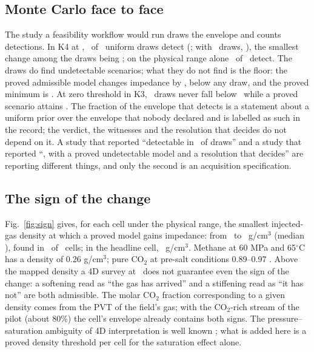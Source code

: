 \documentclass[preprint,11pt,authoryear]{elsarticle}
\begin{document}
\subsection{Monte Carlo face to face}
The study a feasibility workflow would run draws the envelope and counts detections. In K4 at \DTheta, \DMcFourTenKDetect\ of \DMcFourTenKDraws\ uniform draws detect (\DMcFourTenKP; with \DMcFourKDraws\ draws, \DMcFourKP), the smallest change among the draws being \DMcFourTenKMin; on the physical range alone \DMcZeroTenKP\ of \DMcZeroTenKDraws\ detect. The draws do find undetectable scenarios; what they do not find is the floor: the proved admissible model changes impedance by \DKFourAttLo, below any draw, and the proved minimum is \DKFourProvedLo. At zero threshold in K3, \DMcThreeDraws\ draws never fall below \DMcThreeMin\ while a proved scenario attains \DMcThreeAttained. The fraction of the envelope that detects is a statement about a uniform prior over the envelope that nobody declared and is labelled as such in the record; the verdict, the witnesses and the resolution that decides do not depend on it. A study that reported ``detectable in \DMcFourTenKP\ of draws'' and a study that reported ``\vRefused, with a proved undetectable model and a resolution that decides'' are reporting different things, and only the second is an acquisition specification.

\subsection{The sign of the change}
Fig.~\ref{fig:sign} gives, for each cell under the physical range, the smallest injected-gas density at which a proved model gains impedance: from \DSignMin\ to \DSignMax\ g/cm$^3$ (median \DSignMedian), found in \DSignFound\ of \DSignOf\ cells; in the headline cell, \DSignHead\ g/cm$^3$. Methane at 60 MPa and 65$^\circ$C has a density of 0.26 g/cm$^3$; pure CO$_2$ at pre-salt conditions 0.89--0.97 \citep{nist}. Above the mapped density a 4D survey at \DTheta\ does not guarantee even the sign of the change: a softening read as ``the gas has arrived'' and a stiffening read as ``it has not'' are both admissible. The molar CO$_2$ fraction corresponding to a given density comes from the PVT of the field's gas; with the CO$_2$-rich stream of the pilot (about 80\%) the cell's envelope already contains both signs. The pressure--saturation ambiguity of 4D interpretation is well known \citep{landro2001}; what is added here is a proved density threshold per cell for the saturation effect alone.
\end{document}
